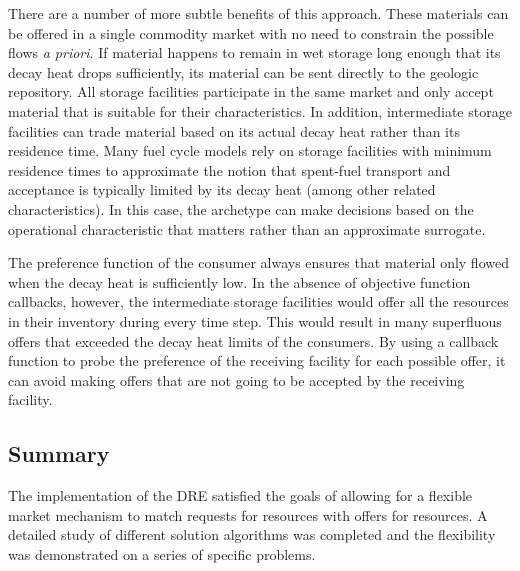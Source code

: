There are a number of more subtle benefits of this approach.  These materials
can be offered in a single commodity market with no need to constrain the
possible flows \textit{a priori}.  If material happens to remain in wet
storage long enough that its decay heat drops sufficiently, its material can
be sent directly to the geologic repository.  All storage facilities
participate in the same market and only accept material that is suitable for
their characteristics.  In addition, intermediate storage facilities can trade
material based on its actual decay heat rather than its residence time.  Many
fuel cycle models rely on storage facilities with minimum residence times to
approximate the notion that spent-fuel transport and acceptance is typically
limited by its decay heat (among other related characteristics).  In this
case, the archetype can make decisions based on the operational characteristic
that matters rather than an approximate surrogate.

The preference function of the consumer always ensures that material only
flowed when the decay heat is sufficiently low.  In the absence of objective
function callbacks, however, the intermediate storage facilities would offer
all the resources in their inventory during every time step.  This would
result in many superfluous offers that exceeded the decay heat limits of the
consumers.  By using a callback function to probe the preference of the
receiving facility for each possible offer, it can avoid making offers that
are not going to be accepted by the receiving facility.

 
\subsection{Summary}

The implementation of the \gls{DRE} satisfied the goals of allowing for a
flexible market mechanism to match requests for resources with offers for
resources.  A detailed study of different solution algorithms was
completed and the flexibility was demonstrated on a
series of specific problems.
